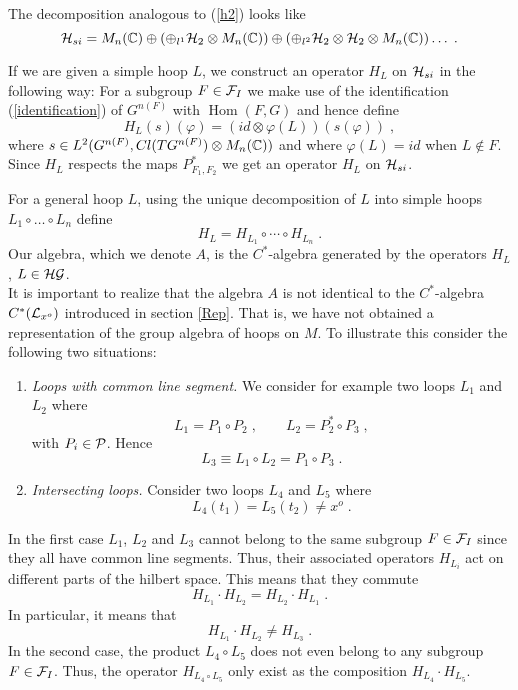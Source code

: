 \documentclass[12pt]{article}
\def\cf{{\cal F}}
\def\cg{{\cal G}}
\def\ch{{\cal H}}
\def\cl{{\cal L}}
\def\cp{{\cal P}}
\newcommand{\bbC}{{\Bbb C}}
\newcommand{\Hom}{\operatorname{Hom}}
\begin{document}
 The decomposition analogous to (\ref{h2}) looks like
$$\ch_{si}=M_n (\bbC) \oplus (\oplus_{l^1}\ch_2 \otimes M_n(\bbC))\oplus
 (\oplus_{l^2} \ch_2 \otimes \ch_2 \otimes M_n(\bbC ))\ldots  \;.$$

If we are given a simple hoop $L$, we construct an operator $H_L$ on
$\ch_{si}$ in the following way:  For  a subgroup $F\in \cf_I$ we make use of
the identification (\ref{identification}) of $G^{n(F)}$ with $\Hom (F,G)$ and hence define
$$H_L (s)(\varphi )= (id \otimes \varphi(L) )(s(\varphi ))\;,$$
where $s\in  L^2(G^{n(F)},Cl(TG^{n(F)})\otimes M_n(\bbC))$ and where $\varphi
(L)=id$ when $L\notin F$. Since $H_L$ respects the maps $P_{F_1,F_2}^*$ we get
an operator $H_L$ on $\ch_{si}$. 

For a general hoop $L$, using the unique decomposition of $L$ into simple hoops $L_1\circ \ldots \circ L_n$  define $$H_L=H_{L_1}\circ \cdots \circ H_{L_n}\;.$$ 
Our algebra, which we denote $A$, is the $C^*$-algebra generated by the operators $H_L$, $L\in
\ch\cg$.  \\

It is important to realize that the
algebra $A$ is not identical to the $C^*$-algebra $C^*(\cl_{x^o})$
introduced in section \ref{Rep}. That is, we have not obtained a
representation of the group algebra of hoops on $M$. To illustrate this
consider the following two
situations:
\begin{enumerate}
\item {\it Loops with common line segment.} We consider for example two
  loops $L_1$ and $L_2$ where 
\[
L_1 = P_1\circ P_2\;,\qquad L_2 = P_2^*\circ P_3\;,
\]
with $P_i\in\cp$. Hence
\[
L_3\equiv L_1\circ L_2 = P_1\circ P_3\;.
\] 
\item {\it Intersecting loops.} Consider two loops $L_4$ and $L_5$
  where
\[
L_4(t_1)=L_5(t_2)\not= x^o\;.
\]
\end{enumerate}
In the first case $L_1$, $L_2$ and $L_3$ cannot belong to the same subgroup
$F\in\cf_I$ since they all have common line segments. Thus, their associated operators $H_{L_i}$ act on
different parts of the hilbert space. This means that they commute
\[
H_{L_1}\cdot H_{L_2}= H_{L_2}\cdot H_{L_1}\;.
\] 
In particular, it means that
\[
H_{L_1}\cdot H_{L_2}\not= H_{L_3}\;.
\]
In the second case, the product $L_4\circ L_5$ does not even belong to any
subgroup $F\in\cf_I$. Thus, the operator $H_{L_4\circ L_5}$ only exist as the
composition $H_{L_4}\cdot H_{L_5}$. 
\end{document}
